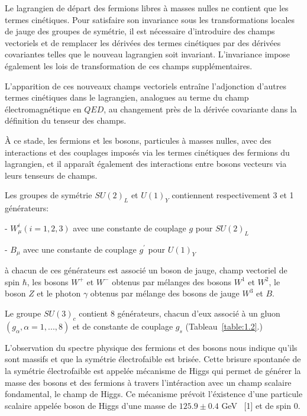 Le lagrangien de d\'epart des fermions libres \`a masses nulles ne contient que les termes cin\'etiques. Pour satisfaire son invariance sous les transformations locales de jauge des groupes de sym\'etrie, il est n\'ecessaire d'introduire des champs vectoriels et de remplacer les d\'eriv\'ees des termes cin\'etiques par des d\'eriv\'ees covariantes telles que le nouveau lagrangien soit invariant. L'invariance impose \'egalement les lois de transformation de ces champs suppl\'ementaires.
~\par L'apparition de ces nouveaux champs vectoriels entra\^ine l'adjonction d'autres termes cin\'etiques dans le lagrangien, analogues au terme du champ \'electromagn\'etique en $QED$, au changement pr\`es de la d\'eriv\'ee covariante dans la d\'efinition du tenseur des champs.
~\par \`A ce stade, les fermions et les bosons, particules \`a masses nulles, avec des interactions et des couplages impos\'es via les termes cin\'etiques des fermions du lagrangien, et il appara\^it \'egalement des interactions entre bosons vecteurs via leurs tenseurs de champs.
~\par Les groupes de sym\'etrie ${SU(2)_L}$ et ${U(1)_Y}$ contiennent respectivement 3 et 1 g\'en\'erateurs:
~\par - $W_{\mu}^{i}(i={1,2,3})$ avec une constante de couplage $g$ pour ${SU(2)_L}$
~\par - $B_{\mu}$ avec une constante de couplage $g^\prime$ pour ${U(1)_Y}$
~\par \`a chacun de ces g\'en\'erateurs est associ\'e un boson de jauge, champ vectoriel de spin $\hbar$, les bosons $W^+$ et $W^-$ obtenus par m\'elanges des bosons $W^1$ et $W^2$, le boson $Z$ et le photon $\gamma$ obtenus par m\'elange des bosons de jauge $W^3$ et $B$.
~\par Le groupe ${SU(3)_c}$ contient 8 g\'en\'erateurs, chacun d'eux associ\'e \`a un gluon $(g_\alpha, \alpha=1,...,8)$ et de constante de couplage $g_s$ (Tableau~\ref{table:1.2}.)
~\par L'observation du spectre physique des fermions et des bosons nous indique qu'ils sont massifs et que la sym\'etrie \'electrofaible est bris\'ee. Cette brisure spontan\'ee de la sym\'etrie \'electrofaible est appel\'ee m\'ecanisme de Higgs qui permet de g\'en\'erer la masse des bosons et des fermions \`a travers l'int\'eraction avec un champ scalaire fondamental, le champ de Higgs. Ce m\'ecanisme pr\'evoit l'\'existence d'une particule scalaire appel\'ee boson de Higgs d'une masse de $125.9 \pm 0.4$ GeV \ [1] et de spin $0$.

